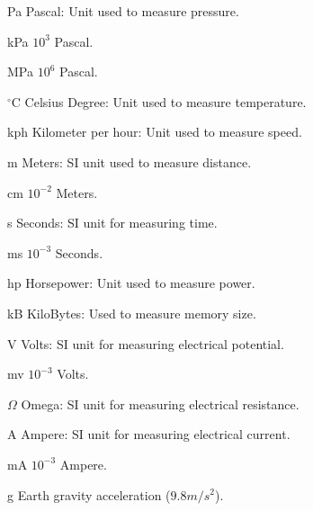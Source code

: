 \begin{simbolos}
	\item[Pa] Pascal: Unit used to measure pressure.
	\item[kPa] $10^3$ Pascal.
	\item[MPa] $10^6$ Pascal.
	\item[$^{\circ}$C] Celsius Degree: Unit used to measure temperature.
	\item[kph] Kilometer per hour: Unit used to measure speed.
	\item[m] Meters: SI unit used to measure distance.
	\item[cm] $10^{-2}$ Meters.
	\item[s] Seconds: SI unit for measuring time.
	\item[ms] $10^{-3}$ Seconds.
	\item[hp] Horsepower: Unit used to measure power.
	\item[kB] KiloBytes: Used to measure memory size.
	\item[V] Volts: SI unit for measuring electrical potential.
	\item[mv]  $10^{-3}$ Volts.
	\item[$\Omega$] Omega: SI unit for measuring electrical resistance.
	\item[A] Ampere: SI unit for measuring electrical current.
	\item[mA]  $10^{-3}$ Ampere.
	\item[g] Earth gravity acceleration ($9.8m/s^2$).
\end{simbolos}